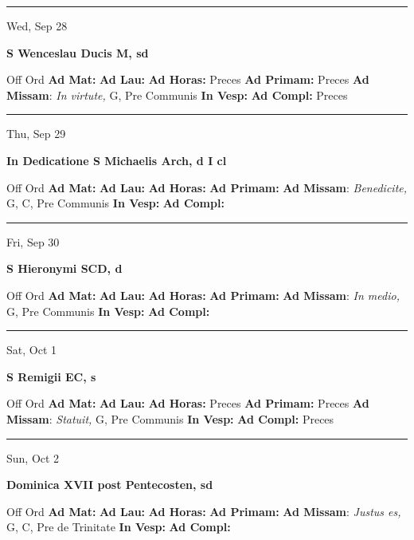 \documentclass[letterpaper, 10pt]{article}
\begin{document}
\hrule
\begin{center}
Wed, Sep 28
\end{center}\textbf{ \large S Wenceslau Ducis M, \textnormal{\normalsize sd}}
\begin{justify}
Off Ord
\textbf{Ad Mat: }
\textbf{Ad Lau: }
\textbf{Ad Horas: }Preces
\textbf{Ad Primam: }Preces
\textbf{Ad Missam}: \textit{In virtute,} G, Pre Communis
\textbf{In Vesp: }
\textbf{Ad Compl: }Preces\end{justify}



\hrule
\begin{center}
Thu, Sep 29
\end{center}\textbf{ \large In Dedicatione S Michaelis Arch, \textnormal{\normalsize d I cl}}
\begin{justify}
Off Ord
\textbf{Ad Mat: }
\textbf{Ad Lau: }
\textbf{Ad Horas: }
\textbf{Ad Primam: }
\textbf{Ad Missam}: \textit{Benedicite,} G, C, Pre Communis
\textbf{In Vesp: }
\textbf{Ad Compl: }\end{justify}



\hrule
\begin{center}
Fri, Sep 30
\end{center}\textbf{ \large S Hieronymi SCD, \textnormal{\normalsize d}}
\begin{justify}
Off Ord
\textbf{Ad Mat: }
\textbf{Ad Lau: }
\textbf{Ad Horas: }
\textbf{Ad Primam: }
\textbf{Ad Missam}: \textit{In medio,} G, Pre Communis
\textbf{In Vesp: }
\textbf{Ad Compl: }\end{justify}



\hrule
\begin{center}
Sat, Oct 1
\end{center}\textbf{ \large S Remigii EC, \textnormal{\normalsize s}}
\begin{justify}
Off Ord
\textbf{Ad Mat: }
\textbf{Ad Lau: }
\textbf{Ad Horas: }Preces
\textbf{Ad Primam: }Preces
\textbf{Ad Missam}: \textit{Statuit,} G, Pre Communis
\textbf{In Vesp: }
\textbf{Ad Compl: }Preces\end{justify}



\hrule
\begin{center}
Sun, Oct 2
\end{center}\textbf{ \large Dominica XVII post Pentecosten, \textnormal{\normalsize sd}}
\begin{justify}
Off Ord
\textbf{Ad Mat: }
\textbf{Ad Lau: }
\textbf{Ad Horas: }
\textbf{Ad Primam: }
\textbf{Ad Missam}: \textit{Justus es,} G, C, Pre de Trinitate
\textbf{In Vesp: }
\textbf{Ad Compl: }\end{justify}
\end{document}
